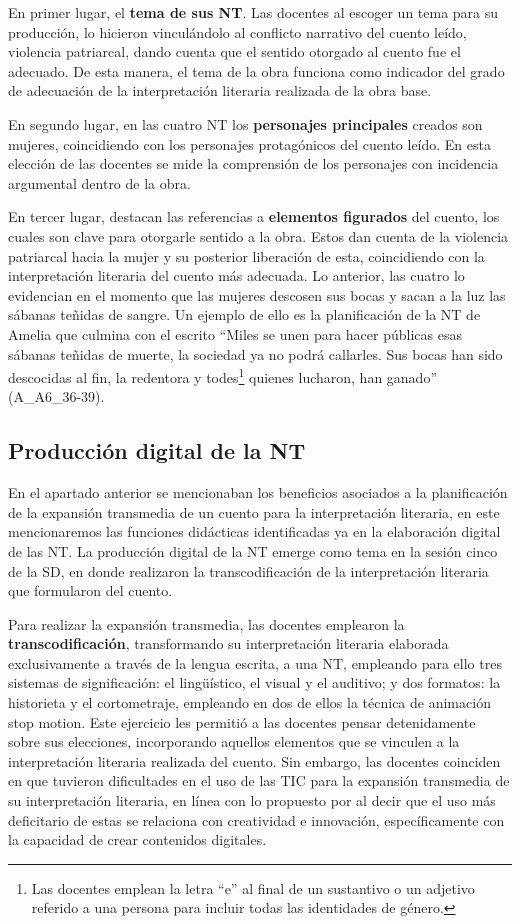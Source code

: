 \documentclass[spanish]{textolivre}
\begin{document}
En primer lugar, el \textbf{tema de sus NT}. Las docentes al escoger un tema para su producción, lo hicieron vinculándolo al conflicto narrativo del cuento leído, violencia patriarcal, dando cuenta que el sentido otorgado al cuento fue el adecuado. De esta manera, el tema de la obra funciona como indicador del grado de adecuación de la interpretación literaria realizada de la obra base.

En segundo lugar, en las cuatro NT los \textbf{personajes principales} creados son mujeres, coincidiendo con los personajes protagónicos del cuento leído. En esta elección de las docentes se mide la comprensión de los personajes con incidencia argumental dentro de la obra. 

En tercer lugar, destacan las referencias a \textbf{elementos figurados} del cuento, los cuales son clave para otorgarle sentido a la obra. Estos dan cuenta de la violencia patriarcal hacia la mujer y su posterior liberación de esta, coincidiendo con la interpretación literaria del cuento más adecuada. Lo anterior, las cuatro lo evidencian en el momento que las mujeres descosen sus bocas y sacan a la luz las sábanas teñidas de sangre. Un ejemplo de ello es la planificación de la NT de Amelia que culmina con el escrito “Miles se unen para hacer públicas esas sábanas teñidas de muerte, la sociedad ya no podrá callarles. Sus bocas han sido descocidas al fin, la redentora y todes\footnote{Las docentes emplean la letra “e” al final de un sustantivo o un adjetivo referido a una persona para incluir todas las identidades de género.} quienes lucharon, han ganado” (A\_A6\_36-39).

\subsection{Producción digital de la NT}\label{sec-resumo}
En el apartado anterior se mencionaban los beneficios asociados a la planificación de la expansión transmedia de un cuento para la interpretación literaria, en este mencionaremos las funciones didácticas identificadas ya en la elaboración digital de las NT. La producción digital de la NT emerge como tema en la sesión cinco de la SD, en donde realizaron la transcodificación de la interpretación literaria que formularon del cuento.

Para realizar la expansión transmedia, las docentes emplearon la \textbf{transcodificación}, transformando su interpretación literaria elaborada exclusivamente a través de la lengua escrita, a una NT, empleando para ello tres sistemas de significación: el lingüístico, el visual y el auditivo; y dos formatos: la historieta y el cortometraje, empleando en dos de ellos la técnica de animación stop motion. Este ejercicio les permitió a las docentes pensar detenidamente sobre sus elecciones, incorporando aquellos elementos que se vinculen a la interpretación literaria realizada del cuento. Sin embargo, las docentes coinciden en que tuvieron dificultades en el uso de las TIC para la expansión transmedia de su interpretación literaria, en línea con lo propuesto por \textcite{aguilar_cuesta_covid-19_2022} al decir que el uso más deficitario de estas se relaciona con creatividad e innovación, específicamente con la capacidad de crear contenidos digitales. 
\end{document}
